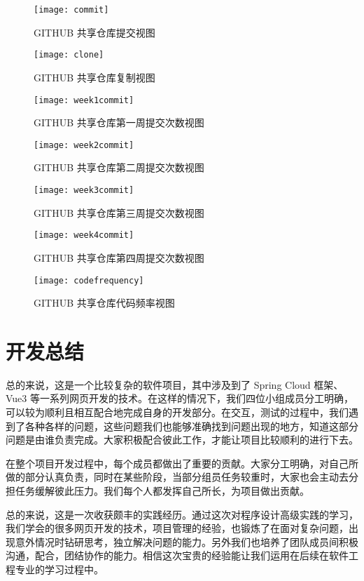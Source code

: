 \begin{figure}[htbp]
    \centering
    \texttt{[image: commit]}
    \caption{GITHUB 共享仓库提交视图}\label{fig:commit}
    \vspace{\baselineskip}
\end{figure}
\begin{figure}[htbp]
    \centering
    \texttt{[image: clone]}
    \caption{GITHUB 共享仓库复制视图}\label{fig:clone}
    \vspace{\baselineskip}
\end{figure}
\begin{figure}[htbp]
    \centering
    \texttt{[image: week1commit]}
    \caption{GITHUB 共享仓库第一周提交次数视图}\label{fig:week1commit}
    \vspace{\baselineskip}
\end{figure}
\begin{figure}[htbp]
    \centering
    \texttt{[image: week2commit]}
    \caption{GITHUB 共享仓库第二周提交次数视图}\label{fig:week2commit}
    \vspace{\baselineskip}
\end{figure}
\begin{figure}[htbp]
    \centering
    \texttt{[image: week3commit]}
    \caption{GITHUB 共享仓库第三周提交次数视图}\label{fig:week3commit}
    \vspace{\baselineskip}
\end{figure}
\begin{figure}[htbp]
    \centering
    \texttt{[image: week4commit]}
    \caption{GITHUB 共享仓库第四周提交次数视图}\label{fig:week4commit}
    \vspace{\baselineskip}
\end{figure}
\begin{figure}[htbp]
    \centering
    \texttt{[image: codefrequency]}
    \caption{GITHUB 共享仓库代码频率视图}\label{fig:codefrequency}
    \vspace{\baselineskip}
\end{figure}

\section{开发总结}
总的来说，这是一个比较复杂的软件项目，其中涉及到了 Spring Cloud 框架、Vue3 等一系列网页开发的技术。在这样的情况下，我们四位小组成员分工明确，可以较为顺利且相互配合地完成自身的开发部分。在交互，测试的过程中，我们遇到了各种各样的问题，这些问题我们也能够准确找到问题出现的地方，知道这部分问题是由谁负责完成。大家积极配合彼此工作，才能让项目比较顺利的进行下去。

在整个项目开发过程中，每个成员都做出了重要的贡献。大家分工明确，对自己所做的部分认真负责，同时在某些阶段，当部分组员任务较重时，大家也会主动去分担任务缓解彼此压力。我们每个人都发挥自己所长，为项目做出贡献。

总的来说，这是一次收获颇丰的实践经历。通过这次对程序设计高级实践的学习，我们学会的很多网页开发的技术，项目管理的经验，也锻炼了在面对复杂问题，出现意外情况时钻研思考，独立解决问题的能力。另外我们也培养了团队成员间积极沟通，配合，团结协作的能力。相信这次宝贵的经验能让我们运用在后续在软件工程专业的学习过程中。

